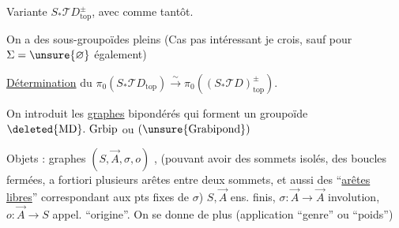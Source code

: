 Variante $S_*\mathcal TD_{\mathrm{top}}^\pm$, avec
comme tantôt.

On a des sous-groupoïdes pleins
(Cas pas intéressant je crois, sauf pour $\Sigma=\unsure{\varnothing}$
également)


 \uline{Détermination} du
$\pi_0(S_*\mathcal TD_{\mathrm{top}})
 \xrightarrow{\sim}\pi_0((S_*\mathcal TD)^\pm_{\mathrm{top}})$.

On introduit les \uline{graphes}  bipondérés
qui forment un groupoïde $\deleted{\mathrm{MD}}.\ \mathrm{Grbip}$
ou $(\unsure{\mathrm{Grabipond}})$

Objets : graphes  $(S,\vec A,\sigma,o)$
,
(pouvant avoir des sommets isolés, des boucles fermées, a fortiori
plusieurs arêtes entre deux sommets, et aussi des ``\uline{arêtes libres}''
correspondant aux pts fixes de $\sigma$)
$S,\vec A$ ens. finis, $\sigma:\vec A\longrightarrow\vec A$ involution,
$o:\vec A\longrightarrow S$ appel. ``origine''.
On se donne de plus
(application ``genre'' ou ``poids'')

